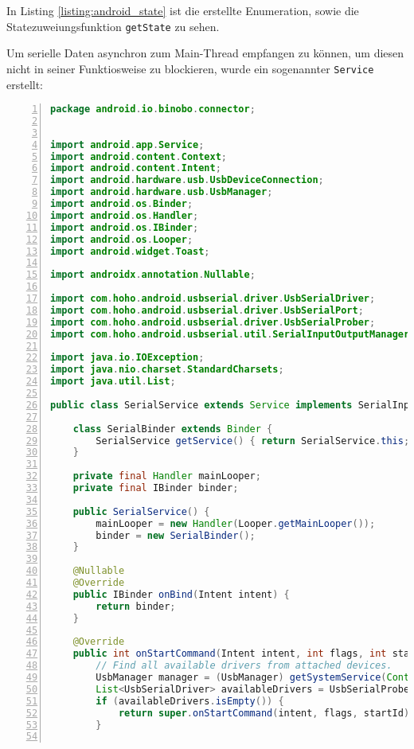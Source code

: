 \documentclass[paper=a4,12pt]{scrreprt}
\begin{document}
In Listing \ref{listing:android_state} ist die erstellte Enumeration, sowie die Statezuweiungsfunktion \texttt{getState} zu sehen.\newline

Um serielle Daten asynchron zum Main-Thread empfangen zu können, um diesen nicht in seiner Funktiosweise zu blockieren, wurde ein sogenannter \texttt{Service} erstellt:\newline

\begin{lstlisting}[caption={SerialService Klasse}, captionpos=b, label={listing:android_service}, language=java, numbers=left,
  stepnumber=1]
package android.io.binobo.connector;


import android.app.Service;
import android.content.Context;
import android.content.Intent;
import android.hardware.usb.UsbDeviceConnection;
import android.hardware.usb.UsbManager;
import android.os.Binder;
import android.os.Handler;
import android.os.IBinder;
import android.os.Looper;
import android.widget.Toast;

import androidx.annotation.Nullable;

import com.hoho.android.usbserial.driver.UsbSerialDriver;
import com.hoho.android.usbserial.driver.UsbSerialPort;
import com.hoho.android.usbserial.driver.UsbSerialProber;
import com.hoho.android.usbserial.util.SerialInputOutputManager;

import java.io.IOException;
import java.nio.charset.StandardCharsets;
import java.util.List;

public class SerialService extends Service implements SerialInputOutputManager.Listener {

    class SerialBinder extends Binder {
        SerialService getService() { return SerialService.this; }
    }

    private final Handler mainLooper;
    private final IBinder binder;

    public SerialService() {
        mainLooper = new Handler(Looper.getMainLooper());
        binder = new SerialBinder();
    }

    @Nullable
    @Override
    public IBinder onBind(Intent intent) {
        return binder;
    }

    @Override
    public int onStartCommand(Intent intent, int flags, int startId) {
        // Find all available drivers from attached devices.
        UsbManager manager = (UsbManager) getSystemService(Context.USB_SERVICE);
        List<UsbSerialDriver> availableDrivers = UsbSerialProber.getDefaultProber().findAllDrivers(manager);
        if (availableDrivers.isEmpty()) {
            return super.onStartCommand(intent, flags, startId);
        }


\end{lstlisting}
\end{document}
